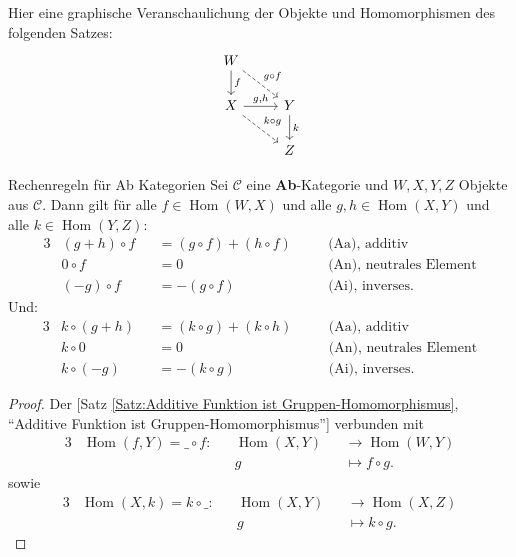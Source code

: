 \documentclass[a4paper]{amsart}
\theoremstyle{definition}
\newcommand{\myRef}[2]{[#1 \ref{#1:#2}, ``#2'']}
\DeclareMathOperator{\Hom}{Hom}
\newcommand{\CC}{\ensuremath{\mathcal{ C }}}
\begin{document}
Hier eine graphische Veranschaulichung der Objekte und Homomorphismen des folgenden Satzes:
\begin{equation}
   \begin{tikzcd}
      W \arrow[d, "f"] \arrow[dr, dashed, "g \circ f"]\\
      X                \arrow[dr, dashed, "k \circ g"] \arrow[r, "g{,} h"]  &Y \arrow[d, "k"]\\ 
                                                                            &Z   
   \end{tikzcd}
\end{equation}

\begin{Satz}{Rechenregeln für Ab Kategorien}
   Sei $\CC$ eine \textbf{Ab}-Kategorie und $W,X,Y,Z$ Objekte aus $\CC$. Dann gilt für alle $f \in \Hom( W, X )$ und alle $g, h \in \Hom( X, Y )$ und alle $k \in \Hom( Y, Z )$:
   \begin{alignat}{3}
      &(g+h) \circ f &&= (g \circ f) + (h \circ f) && \quad \text{(Aa), additiv}\\
      &0 \circ f     &&= 0                         && \quad \text{(An), neutrales Element}\\
      &(-g) \circ f  &&= -(g \circ f)              && \quad \text{(Ai), inverses}.
   \end{alignat}
   Und:
   \begin{alignat}{3}
      &k \circ (g+h) &&= (k \circ g) + (k \circ h) && \quad \text{(Aa), additiv}\\
      &k \circ 0     &&= 0                         && \quad \text{(An), neutrales Element}\\
      &k \circ (-g)  &&= -(k \circ g)              && \quad \text{(Ai), inverses}.
   \end{alignat}
\end{Satz}
\begin{proof}
   Der \myRef{Satz}{Additive Funktion ist Gruppen-Homomorphismus} verbunden mit
   \begin{alignat}{3}
      &\Hom( f, Y ) = \_ \circ f \colon &&\Hom( X, Y ) &&\to     \Hom( W, Y )\\
      &                                &&g            &&\mapsto f \circ g.
   \end{alignat} 
   sowie 
   \begin{alignat}{3}
      &\Hom( X, k ) = k \circ \_ \colon &&\Hom( X, Y ) &&\to     \Hom( X, Z )\\
      &                                &&g            &&\mapsto k \circ g.
   \end{alignat}
\end{proof}
\end{document}
